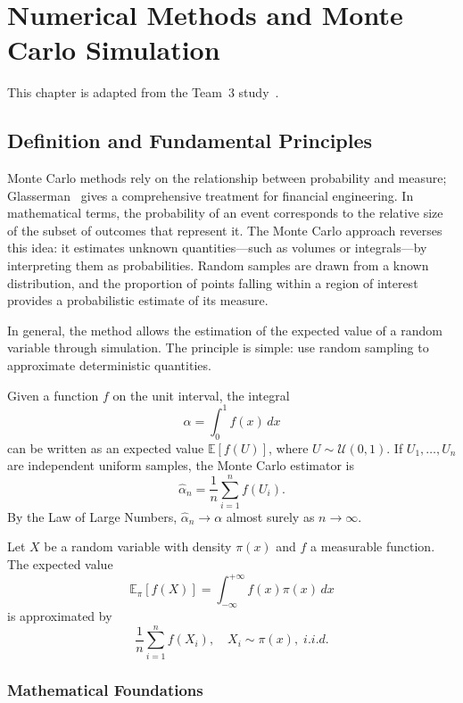 \chapter{Numerical Methods and Monte Carlo Simulation}
\label{ch:monte-carlo}
This chapter is adapted from the Team~3 study~\cite{team3}.

\section{Definition and Fundamental Principles} 

Monte Carlo methods rely on the relationship between probability and measure; Glasserman~\cite{Glasserman2004} gives a comprehensive treatment for financial engineering. In mathematical terms, the probability of an event corresponds to the relative size of the subset of outcomes that represent it. The Monte Carlo approach reverses this idea: it estimates unknown quantities—such as volumes or integrals—by interpreting them as probabilities. Random samples are drawn from a known distribution, and the proportion of points falling within a region of interest provides a probabilistic estimate of its measure.

In general, the method allows the estimation of the expected value of a random variable through simulation. The principle is simple: use random sampling to approximate deterministic quantities.

Given a function \( f \) on the unit interval, the integral
\begin{equation} 
\alpha = \int_{0}^{1} f(x) \,dx
\end{equation}
can be written as an expected value \( \mathbb{E}[f(U)] \), where \( U \sim \mathcal{U}(0,1) \). If \( U_1, \ldots, U_n \) are independent uniform samples, the Monte Carlo estimator is
\begin{equation} 
\hat{\alpha}_n = \frac{1}{n} \sum_{i=1}^{n} f(U_i).
\end{equation}
By the Law of Large Numbers, \( \hat{\alpha}_n \to \alpha \) almost surely as \( n \to \infty \).

\begin{definition}
Let \( X \) be a random variable with density \( \pi(x) \) and \( f \) a measurable function. The expected value
\[
\mathbb{E}_\pi[f(X)] = \int_{-\infty}^{+\infty} f(x)\pi(x)\,dx
\]
is approximated by
\[
\frac{1}{n} \sum_{i=1}^{n} f(X_i), \quad X_i \sim \pi(x), \; i.i.d.
\]
\end{definition}
\subsection{Mathematical Foundations} 


